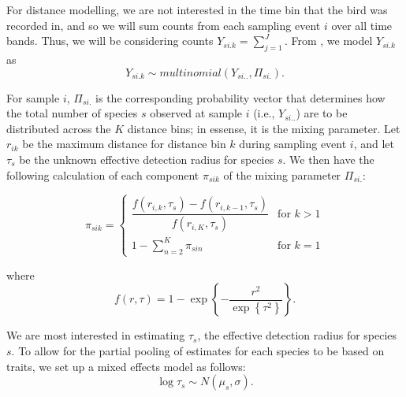\documentclass[12pt]{article}
\begin{document}
\par For distance modelling, we are not interested in the time bin that the bird was recorded in, and so we will sum counts from each sampling event $i$ over all time bands. 
Thus, we will be considering counts $Y_{si.k} = \sum_{j=1}^{J}$. 
From \citet{solymos_calibrating_2013}, we model $Y_{si.k}$ as
$$Y_{si.k} \sim multinomial\left(Y_{si..}, \Pi_{si.}\right).$$

\par For sample $i$, $\Pi_{si.}$ is the corresponding probability vector that determines how the total number of species $s$ observed at sample $i$ (i.e., $Y_{si..}$) are to be distributed across the $K$ distance bins; in essense, it is the mixing parameter. 
Let $r_{ik}$ be the maximum distance for distance bin $k$ during sampling event $i$, and let $\tau_s$ be the unknown effective detection radius for species $s$. 
We then have the following calculation of each component $\pi_{sik}$ of the mixing parameter $\Pi_{si.}$:


\begin{equation*}
	\pi_{sik} = 
	\begin{cases}
		\dfrac{f(r_{i,k}, \tau_s) - f(r_{i,k-1}, \tau_s)}{f(r_{i,K}, \tau_s)} & \text{for } k > 1 \\
		1 - \sum_{n = 2}^{K} \pi_{sin} & \text{for } k = 1
	\end{cases}
\end{equation*}

where 
$$f(r,\tau) =  1 - \exp\left\{ -\dfrac{r^2}{\exp\left\{\tau^2\right\}} \right\} .$$

\par We are most interested in estimating $\tau_s$, the effective detection radius for species $s$. 
To allow for the partial pooling of estimates for each species to be based on traits, we set up a mixed effects model as follows:
$$\log \tau_s \sim N(\mu_s, \sigma).$$
\end{document}
